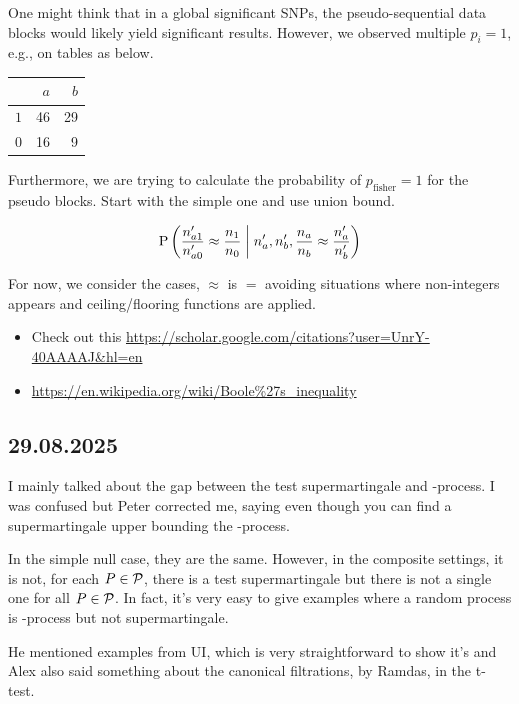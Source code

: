 One might think that in a global significant SNPs, the pseudo-sequential
data blocks would likely yield significant results.
However, we observed multiple $p_i = 1$, e.g., on tables as below.
\begin{table}[h]
	\centering
	\begin{tabular}{lrr}
		\toprule
		    & $a$ & $b$ \\
		\midrule
		$1$ & 46  & 29  \\
		$0$ & 16  & 9   \\
		\bottomrule
	\end{tabular}
\end{table}

Furthermore, we are trying to calculate the probability of
$p_{\mathrm{fisher}}=1$ for the pseudo blocks.
Start with the simple one and use union bound.

\begin{align*}
	\condPR{\frac{n'_{a1}}{n'_{a0}} \approx \frac{n_1}{n_0}}{
		n'_a, n'_b, \frac{n_a}{n_b} \approx \frac{n_a'}{n_b'}
	}
\end{align*}

For now, we consider the cases, $\approx$ is $=$ avoiding situations
where non-integers appears and ceiling/flooring functions are applied.

\begin{itemize}
	\item Check out this \url{https://scholar.google.com/citations?user=UnrY-40AAAAJ&hl=en}
	\item \url{https://en.wikipedia.org/wiki/Boole%27s_inequality}
\end{itemize}

\subsection*{29.08.2025}

I mainly talked about the gap between the test supermartingale and \E-process.
I was confused but Peter corrected me, saying even though you can find a
supermartingale upper bounding the \E-process.

In the simple null case, they are the same. However, in the composite settings,
it is not, for each $P\in\mathcal{P}$, there is a test supermartingale but
there is not a single one for all $P\in\mathcal{P}$.
In fact, it's very easy to give examples where a random process is \E-process
but not supermartingale.

He mentioned examples from UI, which is very straightforward to show it's \E
and Alex also said something about the canonical filtrations, by Ramdas, in
the t-test.

